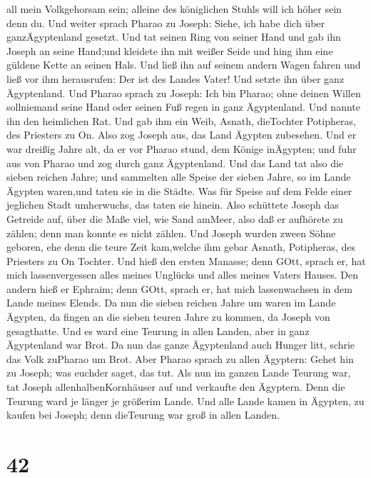 all mein Volkgehorsam sein; alleine des königlichen Stuhls will ich
höher sein denn du.  Und weiter sprach Pharao zu Joseph:
Siehe, ich habe dich über ganzÄgyptenland gesetzt.  Und tat
seinen Ring von seiner Hand und gab ihn Joseph an seine Hand;und
kleidete ihn mit weißer Seide und hing ihm eine güldene Kette an seinen
Hals.  Und ließ ihn auf seinem andern Wagen fahren und ließ
vor ihm herausrufen: Der ist des Landes Vater! Und setzte ihn über ganz
Ägyptenland.  Und Pharao sprach zu Joseph: Ich bin Pharao;
ohne deinen Willen sollniemand seine Hand oder seinen Fuß regen in ganz
Ägyptenland.  Und nannte ihn den heimlichen Rat. Und gab
ihm ein Weib, Asnath, dieTochter Potipheras, des Priesters zu On. Also
zog Joseph aus, das Land Ägypten zubesehen.  Und er war
dreißig Jahre alt, da er vor Pharao stund, dem Könige inÄgypten; und
fuhr aus von Pharao und zog durch ganz Ägyptenland.  Und
das Land tat also die sieben reichen Jahre;  und sammelten
alle Speise der sieben Jahre, so im Lande Ägypten waren,und taten sie in
die Städte. Was für Speise auf dem Felde einer jeglichen Stadt
umherwuchs, das taten sie hinein.  Also schüttete Joseph
das Getreide auf, über die Maße viel, wie Sand amMeer, also daß er
aufhörete zu zählen; denn man konnte es nicht zählen.  Und
Joseph wurden zween Söhne geboren, ehe denn die teure Zeit kam,welche
ihm gebar Asnath, Potipheras, des Priesters zu On Tochter. 
Und hieß den ersten Manasse; denn GOtt, sprach er, hat mich
lassenvergessen alles meines Unglücks und alles meines Vaters Hauses.
 Den andern hieß er Ephraim; denn GOtt, sprach er, hat mich
lassenwachsen in dem Lande meines Elends.  Da nun die
sieben reichen Jahre um waren im Lande Ägypten,  da fingen
an die sieben teuren Jahre zu kommen, da Joseph von gesagthatte. Und es
ward eine Teurung in allen Landen, aber in ganz Ägyptenland war Brot.
 Da nun das ganze Ägyptenland auch Hunger litt, schrie das
Volk zuPharao um Brot. Aber Pharao sprach zu allen Ägyptern: Gehet hin
zu Joseph; was euchder saget, das tut.  Als nun im ganzen
Lande Teurung war, tat Joseph allenhalbenKornhäuser auf und verkaufte
den Ägyptern. Denn die Teurung ward je länger je größerim Lande.
 Und alle Lande kamen in Ägypten, zu kaufen bei Joseph;
denn dieTeurung war groß in allen Landen.

\hypertarget{section-41}{%
\section{42}\label{section-41}}

